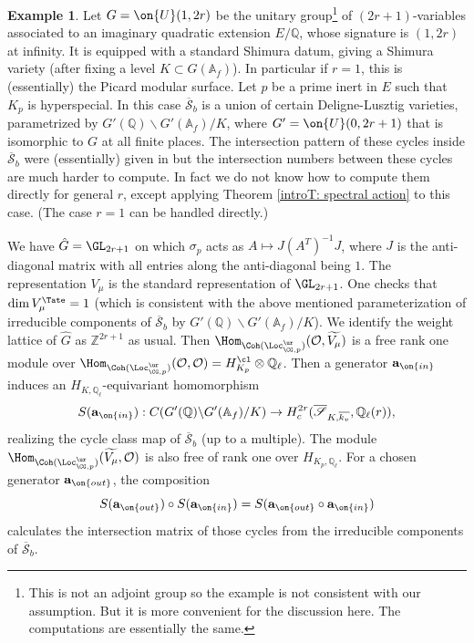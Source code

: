\documentclass[11pt]{amsart}
\theoremstyle{definition}
\theoremstyle{definition}
\newtheorem{ex}[thm]{Example}
\theoremstyle{definition}
\numberwithin{equation}{section}
\newcommand{\bA}{{\mathbb A}}
\newcommand{\bQ}{{\mathbb Q}}
\newcommand{\bZ}{{\mathbb Z}}
\newcommand{\mO}{{\mathcal O}}
\newcommand{\scrS}{{\mathscr S}}
\begin{document}
\begin{ex}\label{Tate cycle on U(1,2n)}
Let $G=\on{U}(1,2r)$ be the unitary group\footnote{This is not an adjoint group so the example is not consistent with our assumption. But it is more convenient for the discussion here. The computations are essentially the same.} of $(2r+1)$-variables associated to an imaginary quadratic extension $E/\bQ$, whose signature is $(1,2r)$ at infinity. It is equipped with a standard Shimura datum, giving a Shimura variety (after fixing a level $K\subset G(\bA_f)$). In particular if $r=1$, this is (essentially) the Picard modular surface. Let $p$ be a prime inert in $E$ such that $K_p$ is hyperspecial.  In this case $\overline{\scrS}_b$ is a union of certain Deligne-Lusztig varieties, parametrized by $G'(\bQ)\backslash G'(\bA_f)/K$, where $G'=\on{U}(0,2r+1)$ that is isomorphic to $G$ at all finite places. The intersection pattern of these cycles inside  $\overline{\scrS}_b$ were (essentially) given in \cite{Vollaard-Wedhorn-GU(n1)} but the intersection numbers between these cycles are much harder to compute. In fact we do not know how to compute them directly for general $r$, except applying Theorem \ref{introT: spectral action} to this case. (The case $r=1$ can be handled directly.)

We have $\hat G=\GL_{2r+1}$ on which $\sigma_p$ acts as $A\mapsto J(A^T)^{-1}J$, where $J$ is the anti-diagonal matrix with all entries along the anti-diagonal being $1$. The representation $V_\mu$ is the standard representation of $\GL_{2r+1}$. One checks that $\dim V_\mu^{\Tate}=1$ (which is consistent with the above mentioned parameterization of irreducible components of $\overline{\scrS}_b$ by $G'(\bQ)\backslash G'(\bA_f)/K$). 
We identify the weight lattice of $\hat G$ as $\bZ^{2r+1}$ as usual. Then $\Hom_{\Coh(\Loc_{\CG,p}^{\ur})}(\mO,\widetilde{V_{\mu}})$ is a free rank one module over $\Hom_{\Coh(\Loc_{\CG,p}^{\ur})}(\mO,\mO)=H_{K_p}^{\cl}\otimes\bQ_\ell$. Then a generator $\mathbf a_{\on{in}}$ induces an $H_{K,\bQ_\ell}$-equivariant homomorphism
$$S(\mathbf a_{\on{in}}): C(G'(\bQ)\backslash G'(\bA_f)/K)\to H_c^{2r}(\overline{\scrS}_{K,\overline{k_v}},\bQ_\ell(r)),$$  
realizing the cycle class map of $\overline\scrS_b$ (up to a multiple). The module  $\Hom_{\Coh(\Loc_{\CG,p}^{\ur})}(\widetilde{V_{\mu}},\mO)$ is also free of rank one over $H_{K_p,\bQ_\ell}$. For a chosen generator $\mathbf a_{\on{out}}$, the composition
\[S(\mathbf a_{\on{out}})\circ S(\mathbf a_{\on{in}})=S(\mathbf a_{\on{out}}\circ\mathbf a_{\on{in}})\]
calculates the intersection matrix of those cycles from the irreducible components of $\overline\scrS_b$. 


\end{ex}
\end{document}
